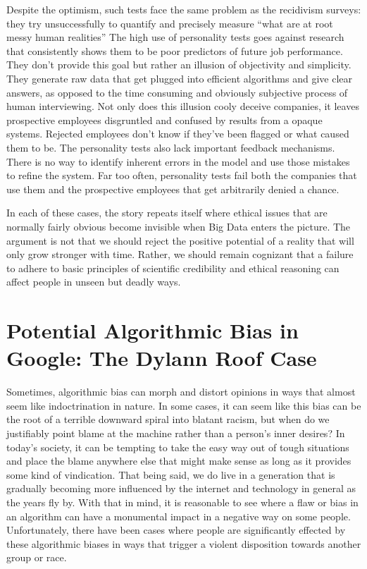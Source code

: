 \documentclass[sigconf]{acmart}
\begin{document}
Despite the optimism, such tests face the same problem as the recidivism surveys: they try unsuccessfully to quantify and precisely measure ``what are at root messy human realities''\cite{Wharton2016} The high use of personality tests goes against research that consistently shows them to be poor predictors of future job performance. They don't provide this goal but rather an illusion of objectivity and simplicity. They generate raw data that get plugged into efficient algorithms and give clear answers, as opposed to the time consuming and obviously subjective process of human interviewing. Not only does this illusion cooly deceive companies, it leaves prospective employees disgruntled and confused by results from a opaque systems. Rejected employees don't know if they've been flagged or what caused them to be. The personality tests also lack important feedback mechanisms. There is no way to identify inherent errors in the model and use those mistakes to refine the system\cite{Wharton2016}. Far too often, personality tests fail both the companies that use them and the prospective employees that get arbitrarily denied a chance.

In each of these cases, the story repeats itself where ethical issues that are normally fairly obvious become invisible when Big Data enters the picture. The argument is not that we should reject the positive potential of a reality that will only grow stronger with time. Rather, we should remain cognizant that a failure to adhere to basic principles of scientific credibility and ethical reasoning can affect people in unseen but deadly ways.


\section{Potential Algorithmic Bias in Google: The Dylann Roof Case}

Sometimes, algorithmic bias can morph and distort opinions in ways that almost seem like indoctrination in nature. In some cases, it can seem like this bias can be the root of a terrible downward spiral into blatant racism, but when do we justifiably point blame at the machine rather than a person's inner desires? In today's society, it can be tempting to take the easy way out of tough situations and place the blame anywhere else that might make sense as long as it provides some kind of vindication. That being said, we do live in a generation that is gradually becoming more influenced by the internet and technology in general as the years fly by. With that in mind, it is reasonable to see where a flaw or bias in an algorithm can have a monumental impact in a negative way on some people. Unfortunately, there have been cases where people are significantly effected by these algorithmic biases in ways that trigger a violent disposition towards another group or race.
\end{document}
